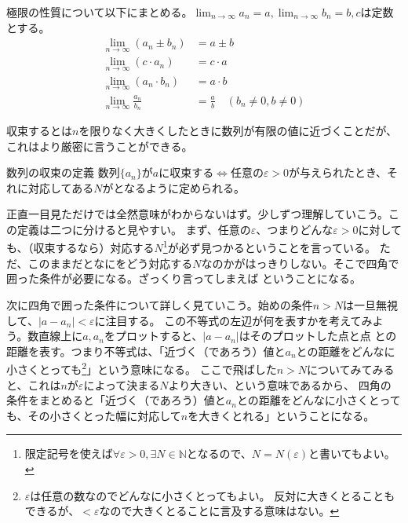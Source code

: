 \documentclass[a4j,dvipdfmx]{jsarticle}
\begin{document}
                極限の性質について以下にまとめる。$\displaystyle\lim_{n\to\infty}a_n=a,\lim_{n\to\infty}b_n=b,cは定数$とする。
                \begin{align}
                    \lim_{n\to\infty}(a_n\pm b_n)&=a\pm b\\
                    \lim_{n\to\infty}(c\cdot a_n)&=c\cdot a\\
                    \lim_{n\to\infty}(a_n\cdot b_n)&=a\cdot b\\
                    \lim_{n\to\infty}\frac{a_n}{b_n}&=\frac{a}{b}\quad(b_n\neq 0,b\neq 0)
                \end{align}

                収束するとは$n$を限りなく大きくしたときに数列が有限の値に近づくことだが、これはより厳密に言うことができる。
                \begin{itembox}{数列の収束の定義}
                    数列$\{a_n\}$が$a$に収束する$\Leftrightarrow $任意の$\varepsilon>0$が与えられたとき、それに対応してある$N$がとなるように定められる。
                \end{itembox}
                正直一目見ただけでは全然意味がわからないはず。少しずつ理解していこう。この定義は二つに分けると見やすい。
                まず、任意の$\varepsilon$、つまりどんな$\varepsilon>0$に対しても、（収束するなら）対応する$N$\footnote{限定記号を使えば$\forall \varepsilon>0,\exists N\in\mathbb{N}$となるので、$N=N(\varepsilon)$と書いてもよい。}が必ず見つかるということを言っている。
                ただ、このままだとなにをどう対応する$N$なのかがはっきりしない。そこで四角で囲った条件が必要になる。ざっくり言ってしまえば
                ということになる。

                次に四角で囲った条件について詳しく見ていこう。始めの条件$n>N$は一旦無視して、$|a-a_n|<\varepsilon$に注目する。
                この不等式の左辺が何を表すかを考えてみよう。数直線上に$a,a_n$をプロットすると、$|a-a_n|$はそのプロットした点と点
                との距離を表す。つまり不等式は、「近づく（であろう）値と$a_n$との距離をどんなに小さくとっても\footnote{$\varepsilon$は任意の数なのでどんなに小さくとってもよい。
                反対に大きくとることもできるが、$<\varepsilon$なので大きくとることに言及する意味はない。}」という意味になる。
                ここで飛ばした$n>N$についてみてみると、これは$n$が$\varepsilon$によって決まる$N$より大きい、という意味であるから、
                四角の条件をまとめると「近づく（であろう）値と$a_n$との距離をどんなに小さくとっても、その小さくとった幅に対応して$n$を大きくとれる」ということになる。\\
\end{document}
